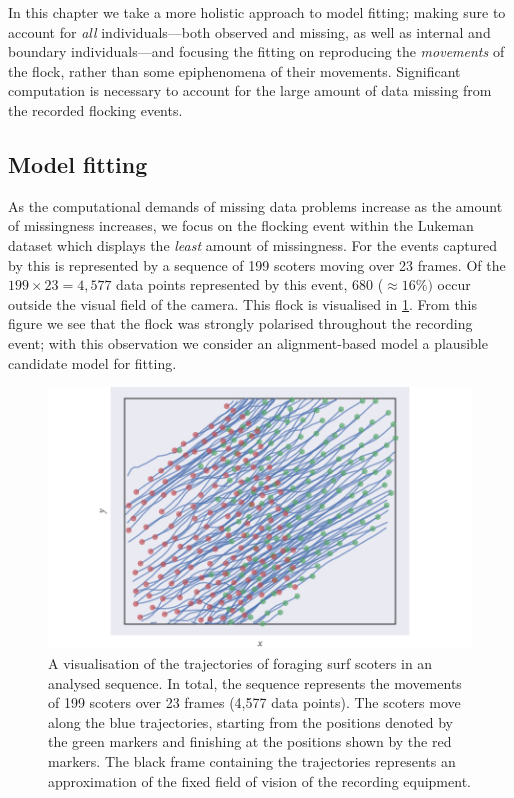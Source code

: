 In this chapter we take a more holistic approach to model fitting; making sure
to account for \emph{all} individuals---both observed and missing, as well as
internal and boundary individuals---and focusing the fitting on reproducing
the \emph{movements} of the flock, rather than some epiphenomena of their
movements. Significant computation is necessary to account for the large amount
of data missing from the recorded flocking events.

\subsection{Model fitting}

As the computational demands of missing data problems increase as the amount of
missingness increases, we focus on the flocking event within the Lukeman dataset
which displays the \emph{least} amount of missingness. For the events captured
by \textcite{lukeman10} this is represented by a sequence of 199 scoters
moving over 23 frames. Of the $199\times23=4,577$ data points represented by
this event, 680 ($\approx16\%)$ occur outside the visual field of the camera.
This flock is visualised in \cref{fig:scoter_traj}. From this figure we see
that the flock was strongly polarised throughout the recording event; with this
observation we consider an alignment-based model a plausible candidate model
for fitting.

\begin{figure}[tb]
  \includegraphics{data_00_traj.pdf}
  \caption{A visualisation of the trajectories of foraging surf scoters in an
    analysed sequence. In total, the sequence represents the movements of
    199 scoters over 23 frames (4,577 data points). The scoters move
    along the blue trajectories, starting from the positions denoted by the
    green markers and finishing at the positions shown by the red markers. The
    black frame containing the trajectories represents an approximation of the
    fixed field of vision of the recording equipment.}
  \label{fig:scoter_traj}
\end{figure}

